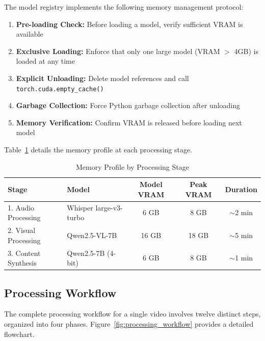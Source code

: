 The model registry implements the following memory management protocol:

\begin{enumerate}
    \item \textbf{Pre-loading Check:} Before loading a model, verify sufficient VRAM is available
    \item \textbf{Exclusive Loading:} Enforce that only one large model (VRAM $>$ 4GB) is loaded at any time
    \item \textbf{Explicit Unloading:} Delete model references and call \texttt{torch.cuda.empty\_cache()}
    \item \textbf{Garbage Collection:} Force Python garbage collection after unloading
    \item \textbf{Memory Verification:} Confirm VRAM is released before loading next model
\end{enumerate}

Table~\ref{tab:memory_stages} details the memory profile at each processing stage.

\begin{table}[h]
\centering
\caption{Memory Profile by Processing Stage}
\label{tab:memory_stages}
\begin{tabular}{|l|l|c|c|c|}
\hline
\textbf{Stage} & \textbf{Model} & \textbf{Model VRAM} & \textbf{Peak VRAM} & \textbf{Duration} \\
\hline
1. Audio Processing & Whisper large-v3-turbo & 6 GB & 8 GB & $\sim$2 min \\
\hline
2. Visual Processing & Qwen2.5-VL-7B & 16 GB & 18 GB & $\sim$5 min \\
\hline
3. Content Synthesis & Qwen2.5-7B (4-bit) & 6 GB & 8 GB & $\sim$1 min \\
\hline
\end{tabular}
\end{table}

\subsection{Processing Workflow}

The complete processing workflow for a single video involves twelve distinct steps, organized into four phases. Figure~\ref{fig:processing_workflow} provides a detailed flowchart.

